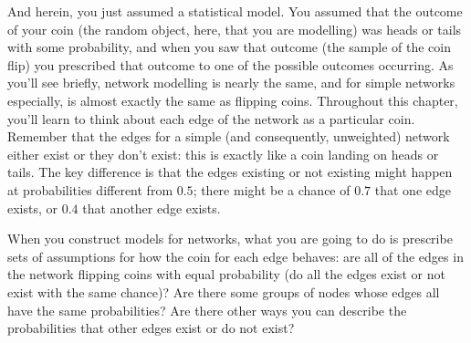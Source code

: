 And herein, you just assumed a statistical model. You assumed that the outcome of your coin (the random object, here, that you are modelling) was heads or tails with some probability, and when you saw that outcome (the {sample} of the coin flip) you prescribed that outcome to one of the possible outcomes occurring. As you'll see briefly, network modelling is nearly the same, and for simple networks especially, is {almost exactly} the same as flipping coins. Throughout this chapter, you'll learn to think about each edge of the network as a particular coin. Remember that the edges for a simple (and consequently, {unweighted}) network either exist or they don't exist: this is exactly like a coin landing on heads or tails. The key difference is that the edges existing or not existing might happen at probabilities different from $0.5$; there might be a chance of $0.7$ that one edge exists, or $0.4$ that another edge exists. 

When you construct models for networks, what you are going to do is prescribe sets of assumptions for how the coin for each edge behaves: are all of the edges in the network flipping coins with equal probability (do all the edges exist or not exist with the same chance)? Are there some groups of nodes whose edges all have the same probabilities? Are there other ways you can describe the probabilities that other edges exist or do not exist? 

